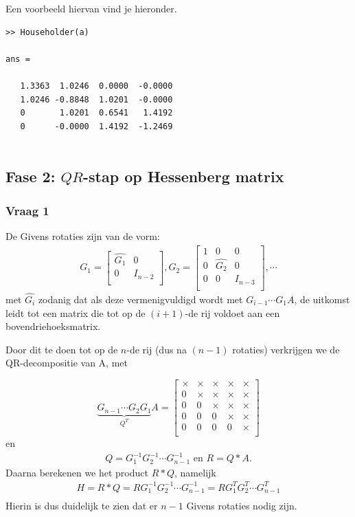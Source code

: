 \documentclass{article}
\begin{document}
Een voorbeeld hiervan vind je hieronder.
\vspace{-5mm}
\begin{lstlisting}
>> Householder(a)

ans =

   1.3363  1.0246  0.0000  -0.0000
   1.0246 -0.8848  1.0201  -0.0000
   0       1.0201  0.6541   1.4192
   0      -0.0000  1.4192  -1.2469
  
\end{lstlisting}

\subsection{Fase 2: $QR$-stap op Hessenberg matrix}
\label{subsec:Fase2}
\subsubsection*{Vraag 1}
De Givens rotaties zijn van de vorm:
\begin{align*}
G_1=\begin{bmatrix}
        \hat{G_1} & 0\\
        0 & I_{n-2}\\
    \end{bmatrix},
G_2=\begin{bmatrix}
        1 & 0 & 0\\
        0 & \hat{G_2} & 0\\
        0 & 0 & I_{n-3}\\
    \end{bmatrix}, \cdots
\end{align*}
met $\hat{G_i}$ zodanig dat als deze vermenigvuldigd wordt met $G_{i-1} \cdots G_{1}A$, de uitkomst leidt tot een matrix die tot op de $(i+1)$-de rij voldoet aan een bovendriehoeksmatrix.

Door dit te doen tot op de $n$-de rij (dus na $(n-1)$ rotaties) verkrijgen we de QR-decompositie van A, met

\[\underbrace{G_{n-1} \cdots G_{2}G_{1}}_{Q^T}A=
\begin{bmatrix}
    \times & \times & \times & \times & \times\\
    0 & \times & \times & \times & \times\\
    0 & 0 & \times & \times & \times\\
    0 & 0 & 0 & \times & \times\\
    0 & 0 & 0 & 0 & \times\\
 \end{bmatrix}\]
en
\begin{align*}
    Q=G_1^{-1}G_2^{-1}\cdots G_{n-1}^{-1} \text{ en } R=Q*A.
\end{align*}
Daarna berekenen we het product $R*Q$, namelijk
\begin{align*}
    H=R*Q=RG_1^{-1}G_2^{-1} \cdots G_{n-1}^{-1}=RG_1^{T}G_2^{T} \cdots G_{n-1}^{T}\\
\end{align*}
Hierin is dus duidelijk te zien dat er $n-1$ Givens rotaties nodig zijn. 
\end{document}
